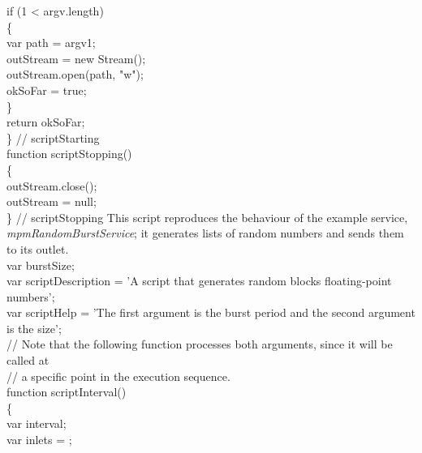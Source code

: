 \tS{}if (1 < argv.length)\\
\tS\{\\
\tS\tS{}var path = argv\openSq{}1\closeSq;\\
        
\tS\tS{}outStream = new Stream();\\
\tS\tS{}outStream.open(path, "w");\\
\tS\tS{}okSoFar = true;\\
\tS\}\\
\tS{}return okSoFar;\\
\} // scriptStarting\\

function scriptStopping()\\
\{\\
\tS{}outStream.close();\\
\tS{}outStream = null;\\
\} // scriptStopping
\codeEnd{}
\secondaryEnd{}
\newpage
{}
This script reproduces the behaviour of the example service, \emph{mpmRandomBurstService};
it generates lists of random numbers and sends them to its outlet.\\

\codeBegin{}
var burstSize;\\

var scriptDescription = 'A script that generates random blocks floating-point numbers';\\

var scriptHelp = 'The first argument is the burst period and the second argument is the
size';\\

// Note that the following function processes both arguments, since it will be called at\\
// a specific point in the execution sequence.\\
function scriptInterval()\\
\{\\
\tS{}var interval;\\
\tS{}var inlets = \openSq{}\closeSq;\\
    
